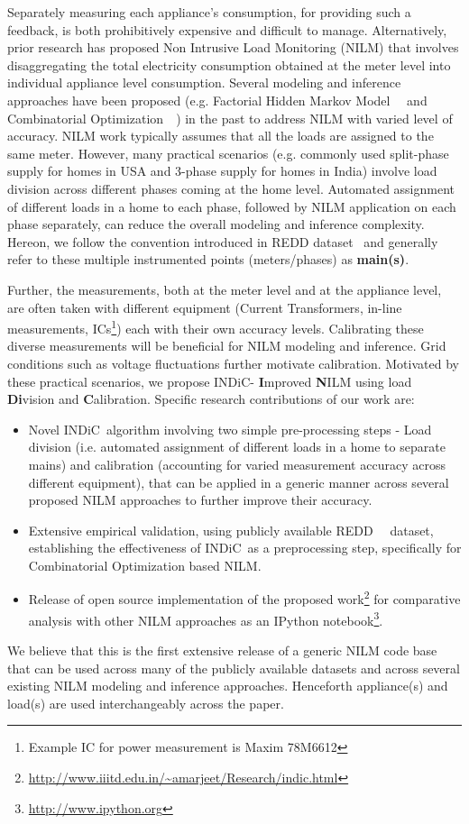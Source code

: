 \documentclass[conference]{IEEEtran}
\newcommand{\indic}{INDiC~}
\newcommand{\indicns}{INDiC}
\begin{document}
\noindent Separately measuring each appliance's consumption, for providing such a feedback, is both prohibitively expensive and difficult to manage. Alternatively, prior research has proposed Non Intrusive Load Monitoring (NILM) that involves disaggregating the total electricity consumption obtained at the meter level into individual appliance level consumption. Several modeling and inference approaches have been proposed (e.g. Factorial Hidden Markov Model~~\cite{Ghahramani_97a} and Combinatorial Optimization~~\cite{hart}) in the past to address NILM with varied level of accuracy. NILM work typically assumes that all the loads are assigned to the same meter. However, many practical scenarios (e.g. commonly used split-phase supply for homes in USA and 3-phase supply for homes in India) involve load division across different phases coming at the home level. Automated assignment of different loads in a home to each phase, followed by NILM application on each phase separately, can reduce the overall modeling and inference complexity. Hereon, we follow the convention introduced in REDD dataset~\cite{redd} and generally refer to these multiple instrumented points (meters/phases) as \textbf{main(s)}.

\noindent Further, the measurements, both at the meter level and at the appliance level, are often taken with different equipment (Current Transformers, in-line measurements, ICs\footnote{Example IC for power measurement is Maxim 78M6612}) each with their own accuracy levels. Calibrating these diverse measurements will be beneficial for NILM modeling and inference. Grid conditions such as voltage fluctuations further motivate calibration. Motivated by these practical scenarios, we propose \indicns - \textbf{I}mproved \textbf{N}ILM using load \textbf{Di}vision and \textbf{C}alibration. Specific research contributions of our work are:
\begin{itemize}
\item Novel \indic algorithm involving two simple pre-processing steps - Load division (i.e. automated assignment of different loads in a home to separate mains) and calibration (accounting for varied measurement accuracy across different equipment), that can be applied in a generic manner across several proposed NILM approaches to further improve their accuracy. 
\item Extensive empirical validation, using publicly available REDD~~\cite{redd} dataset, establishing the effectiveness of \indic as a preprocessing step, specifically for Combinatorial Optimization based NILM. 
\item Release of open source implementation of the proposed work\footnote{\url{http://www.iiitd.edu.in/~amarjeet/Research/indic.html}} for comparative analysis with other NILM approaches as an IPython notebook\footnote{\url{http://www.ipython.org}}. 
\end{itemize}
\noindent We believe that this is the first extensive release of a generic NILM code base that can be used across many of the publicly available datasets and across several existing NILM modeling and inference approaches. Henceforth appliance(s) and load(s) are used interchangeably across the paper.
\end{document}
